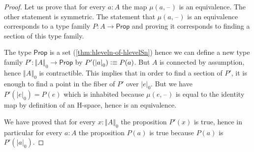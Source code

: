 \documentclass[10pt,a4paper]{article}
\newcommand{\defeq}{\vcentcolon\equiv}  %
\newcommand{\prop}{\ensuremath{\mathsf{Prop}}\xspace}
\newcommand{\trunc}[2]{\mathopen{}\left\Vert #2\right\Vert_{#1}\mathclose{}}
\newcommand{\tproj}[3][]{\mathopen{}\left|#3\right|_{#2}^{#1}\mathclose{}}
\newcommand{\blank}{\mathord{\hspace{1pt}\text{--}\hspace{1pt}}}
\theoremstyle{definition}
\theoremstyle{remark}
\numberwithin{equation}{section}
\begin{document}
\begin{proof}
  Let us prove that for every $a:A$ the map $\mu(a,\blank)$ is an equivalence. The
  other statement is symmetric.
  The statement that $\mu(a,\blank)$ is an equivalence corresponds to a type family
  $P:A\to\prop$ and proving it corresponds to finding a section of this type
  family.

  The type $\prop$ is a set (\cref{thm:hleveln-of-hlevelSn}) hence we can
  define a new type family $P':\trunc0A\to\prop$ by $P'(\tproj0a)\defeq
  P(a)$. But $A$ is connected by assumption, hence $\trunc0A$ is
  contractible. This implies that in order to find a section of $P'$, it is
  enough to find a point in the fiber of $P'$ over $\tproj0e$. But we have
  $P'(\tproj0e)=P(e)$ which is inhabited because $\mu(e,\blank)$ is equal to the
  identity map by definition of an H-space, hence is an equivalence.

  We have proved that for every $x:\trunc0A$ the proposition $P'(x)$ is true,
  hence in particular for every $a:A$ the proposition $P(a)$ is true because
  $P(a)$ is $P'(\tproj0a)$.
\end{proof}
\end{document}
